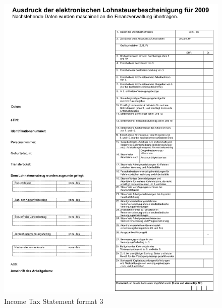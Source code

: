 \begin{figure}[H]
\centering
\includegraphics[scale=0.6]{images/LS-Formats/ls-format-3.png}
\caption{Income Tax Statement format 3}
\label{ls_format2}
\end{figure}
